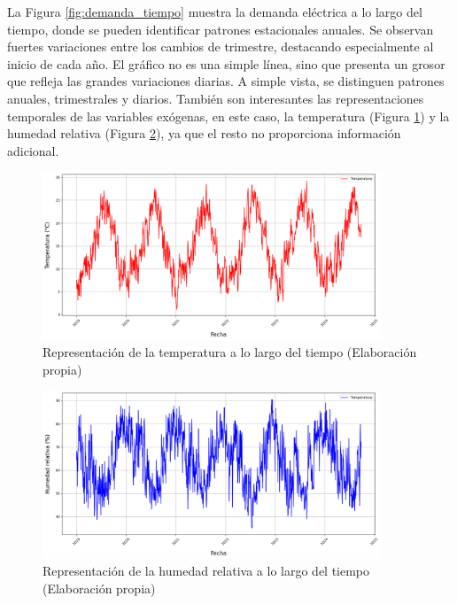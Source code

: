 \documentclass[12pt,a4paper]{report}
\begin{document}
La Figura \ref{fig:demanda_tiempo} muestra la demanda eléctrica a lo largo del tiempo, donde se pueden identificar patrones estacionales anuales. Se observan fuertes variaciones entre los cambios de trimestre, destacando especialmente al inicio de cada año. El gráfico no es una simple línea, sino que presenta un grosor que refleja las grandes variaciones diarias. A simple vista, se distinguen patrones anuales, trimestrales y diarios. También son interesantes las representaciones temporales de las variables exógenas, en este caso, la temperatura (Figura \ref{fig:temperatura_tiempo}) y la humedad relativa (Figura \ref{fig:humedad_tiempo}), ya que el resto no proporciona información adicional.

\begin{figure}[H]
    \centering
    \includegraphics[width=0.9\textwidth]{Images/tfm-3.4B.png}
    \caption{Representación de la temperatura a lo largo del tiempo (Elaboración propia)}
    \label{fig:temperatura_tiempo}
\end{figure}

\begin{figure}[H]
    \centering
    \includegraphics[width=0.9\textwidth]{Images/tfm-3.4C.png}
    \caption{Representación de la humedad relativa a lo largo del tiempo (Elaboración propia)}
    \label{fig:humedad_tiempo}
\end{figure}
\end{document}

